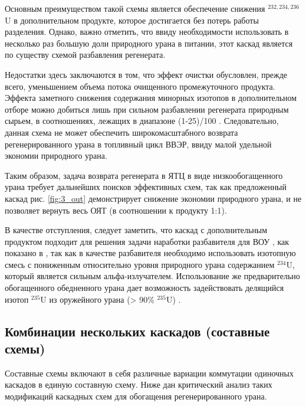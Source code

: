 Основным преимуществом такой схемы является обеспечение снижения $^{232,234,236}$U в дополнительном продукте, которое достигается без потерь работы разделения. Однако, важно отметить, что ввиду необходимости использовать в несколько раз большую доли природного урана в питании, этот каскад является по существу схемой разбавления регенерата.

Недостатки здесь заключаются в том, что эффект очистки обусловлен, прежде всего, уменьшением объема потока очищенного промежуточного продукта. Эффекта заметного снижения содержания минорных изотопов в дополнительном отборе можно добиться лишь при сильном разбавлении регенерата природным сырьем, в соотношениях, лежащих в диапазоне (1-25)/100 \cite{palkinSeparationUraniumIsotopes2010, smirnovKaskadnyeShemyZadachah2012}.
Следовательно, данная схема не может обеспечить широкомасштабного возврата регенерированного урана в топливный цикл ВВЭР, ввиду малой удельной экономии природного урана.

Таким образом, задача возврата регенерата в ЯТЦ в виде низкообогащенного урана требует дальнейших поисков эффективных схем, так как предложенный каскад рис. \ref{fig:3_out} демонстрирует снижение экономии природного урана, и не позволяет вернуть весь ОЯТ (в соотношении к продукту 1:1).

В качестве отступления, следует заметить, что каскад с дополнительным продуктом подходит для решения задачи наработки разбавителя для ВОУ \cite{palkinPOLUChENIERAZBAVITELYaDLYa2017}, как показано в \cite{shopenSposobPolucheniyaRazbavitelya2008}, так как в качестве разбавителя необходимо использовать изотопную смесь с пониженным относительно уровня природного урана содержанием $^{234}$U, который является сильным альфа-излучателем. Использование же предварительно обогащенного обедненного урана дает возможность задействовать делящийся изотоп $^{235}$U из оружейного урана (> 90\% $^{235}$U) \cite{korotkevichRealizaciyaProgrammyVOUNOU2003,SposobPolucheniyaRazbavitelya}.


\subsection{Комбинации нескольких каскадов (составные схемы)}\label{sec:ch1/sec2.3}
Составные схемы включают в себя различные вариации коммутации одиночных каскадов в единую составную схему.
Ниже дан критический анализ таких модификаций каскадных схем для обогащения регенерированного урана.

